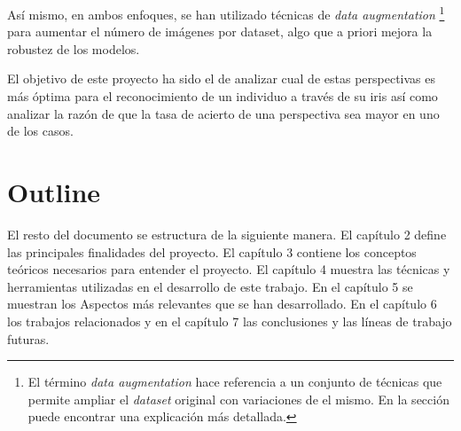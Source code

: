 
Así mismo, en ambos enfoques, se han utilizado técnicas de \textit{data augmentation} \footnote{El término \textit{data augmentation} hace referencia a un conjunto de técnicas que permite ampliar el \textit{dataset} original con variaciones de el mismo. En la sección  puede encontrar una explicación más detallada.} para aumentar el número de imágenes por dataset, algo que a priori mejora la robustez de los modelos.


El objetivo de este proyecto ha sido el de analizar cual de estas perspectivas es más óptima para el reconocimiento de un individuo a través de su iris así como analizar la razón de que la tasa de acierto de una perspectiva sea mayor en uno de los casos.

\section{Outline}

El resto del documento se estructura de la siguiente manera. El capítulo 2  define las principales finalidades del proyecto. El capítulo 3  contiene los conceptos teóricos necesarios
para entender el proyecto. El capítulo 4  muestra las técnicas y herramientas utilizadas en el desarrollo de este trabajo. En el capítulo 5  se muestran los Aspectos
más relevantes que se han desarrollado. En el capítulo 6  los trabajos relacionados y en el capítulo 7  las conclusiones y las líneas de trabajo futuras.
